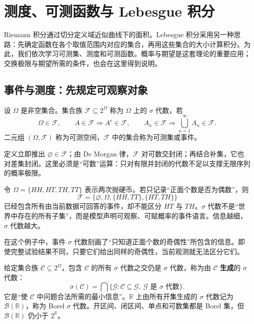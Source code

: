 \chapter{测度、可测函数与 Lebesgue 积分}
\label{ch:measure-integration}


Riemann 积分通过切分定义域近似曲线下的面积。Lebesgue 积分采用另一种思路：先确定函数在各个取值范围内对应的集合，再用这些集合的大小计算积分。为此，我们依次学习可测集、测度和可测函数。概率与期望是这套理论的重要应用；交换极限与期望所需的条件，也会在这里得到说明。

\section{事件与测度：先规定可观察对象}

\begin{definition}[$\sigma$ 代数]
设 $\Omega$ 是非空集合。集合族 $\mathcal{F}\subseteq2^\Omega$ 称为 $\Omega$ 上的 $\sigma$ 代数，若
\[
 \Omega\in\mathcal F,\qquad
 A\in\mathcal F\Longrightarrow A^c\in\mathcal F,\qquad
 A_n\in\mathcal F\Longrightarrow\bigcup_{n=1}^{\infty}A_n\in\mathcal F.
\]
二元组 $(\Omega,\mathcal F)$ 称为可测空间，$\mathcal F$ 中的集合称为可测集或事件。
\end{definition}

定义立即推出 $\varnothing\in\mathcal F$；由 De Morgan 律，$\mathcal F$ 对可数交封闭；再结合补集，它也对差集封闭。这里必须是“可数”运算：只对有限并封闭的代数不足以支撑无限序列的概率极限。


令 $\Omega=\{HH,HT,TH,TT\}$ 表示两次抛硬币。若只记录“正面个数是否为偶数”，则
\[
 \mathcal F=\{\varnothing,\Omega,\{HH,TT\},\{HT,TH\}\}
\]
已经包含所有由当前数据可回答的事件，却不能区分 $HT$ 与 $TH$。$\sigma$ 代数不是“世界中存在的所有子集”，而是模型声明可观察、可赋概率的事件语言。信息越细，$\sigma$ 代数越大。

\begin{note}
在这个例子中，事件 $\sigma$ 代数刻画了“只知道正面个数的奇偶性”所包含的信息。即使完整试验结果不同，只要它们给出同样的奇偶性，当前观测就无法区分它们。
\end{note}


给定集合族 $\mathcal C\subseteq2^\Omega$，包含 $\mathcal C$ 的所有 $\sigma$ 代数之交仍是 $\sigma$ 代数，称为由 $\mathcal C$ \textbf{生成}的 $\sigma$ 代数：
\[
 \sigma(\mathcal C)=\bigcap\{\mathcal G:\mathcal C\subseteq\mathcal G,
 \ \mathcal G\text{ 是 }\sigma\text{ 代数}\}.
\]
它是“使 $\mathcal C$ 中问题合法所需的最小信息”。$\mathbb R$ 上由所有开集生成的 $\sigma$ 代数记为 $\mathcal B(\mathbb R)$，称为 Borel $\sigma$ 代数。开区间、闭区间、单点和可数集都是 Borel 集，但 $\mathcal B(\mathbb R)$ 仍小于 $2^{\mathbb R}$。

